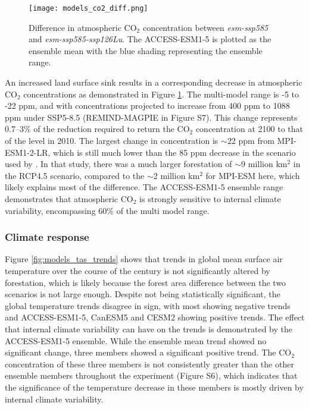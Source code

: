 \documentclass[draft]{agujournal2019}
\begin{document}
\begin{figure}
    \texttt{[image: models\_co2\_diff.png]}
    \caption{Difference in atmospheric CO$_2$ concentration between \textit{esm-ssp585} and \textit{esm-ssp585-ssp126Lu}. The ACCESS-ESM1-5 is plotted as the ensemble mean with the blue shading representing the ensemble range.}
    \label{fig:models_CO2}
\end{figure}

An increased land surface sink results in a corresponding decrease in atmospheric CO$_2$ concentrations as demonstrated in Figure \ref{fig:models_CO2}.
The multi-model range is -5 to -22 ppm, and with concentrations projected to increase from 400 ppm to 1088 ppm under SSP5-8.5 (REMIND-MAGPIE in Figure S7).
This change represents 0.7–3\% of the reduction required to return the CO$_2$ concentration at 2100 to that of the level in 2010.
The largest change in concentration is $\sim$22 ppm from MPI-ESM1-2-LR, which is still much lower than the 85 ppm decrease in the scenario used by .
In that study, there was a much larger forestation of $\sim$9 million km$^2$ in the RCP4.5 scenario, compared to the $\sim$2 million km$^2$ for MPI-ESM here, which likely explains most of the difference.
The ACCESS-ESM1-5 ensemble range demonstrates that atmospheric CO$_2$ is strongly sensitive to internal climate variability, encompassing 60\% of the multi model range.

\subsubsection{Climate response}

Figure \ref{fig:models_tas_trends} shows that trends in global mean surface air temperature over the course of the century is not significantly altered by forestation, which is likely because the forest area difference between the two scenarios is not large enough.
Despite not being statistically significant, the global temperature trends disagree in sign, with most showing negative trends and ACCESS-ESM1-5, CanESM5 and CESM2 showing positive trends.
The effect that internal climate variability can have on the trends is demonstrated by the ACCESS-ESM1-5 ensemble.
While the ensemble mean trend showed no significant change, three members showed a significant positive trend.
The CO$_2$ concentration of these three members is not consistently greater than the other ensemble members throughout the experiment (Figure S6), which indicates that the significance of the temperature decrease in these members is mostly driven by internal climate variability.
\end{document}
